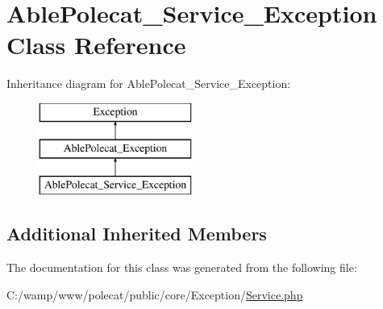 \hypertarget{class_able_polecat___service___exception}{}\section{Able\+Polecat\+\_\+\+Service\+\_\+\+Exception Class Reference}
\label{class_able_polecat___service___exception}
Inheritance diagram for Able\+Polecat\+\_\+\+Service\+\_\+\+Exception\+:\begin{figure}[H]
\begin{center}
\leavevmode
\includegraphics[height=3.000000cm]{class_able_polecat___service___exception}
\end{center}
\end{figure}
\subsection*{Additional Inherited Members}


The documentation for this class was generated from the following file\+:\begin{DoxyCompactItemize}
\item 
C\+:/wamp/www/polecat/public/core/\+Exception/\hyperlink{_exception_2_service_8php}{Service.\+php}\end{DoxyCompactItemize}
